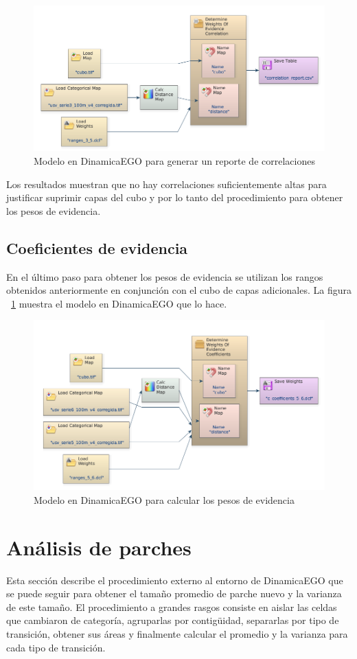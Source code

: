 \documentclass[12pt,a4paper,oldfontcommands]{article}
\begin{document}
\begin{figure}[H]
	\centering
	\includegraphics[width=1\textwidth]{./figuras/correlacion.png}
	\caption{Modelo en DinamicaEGO para generar un reporte de correlaciones}
\end{figure}
Los resultados muestran que no hay correlaciones suficientemente altas para justificar suprimir capas del cubo y por lo tanto del procedimiento para obtener los pesos de evidencia.
\subsection{Coeficientes de evidencia}
En el último paso para obtener los pesos de evidencia se utilizan los rangos obtenidos anteriormente en conjunción con el cubo de capas adicionales. La figura ~\ref{fig:evidence} muestra el modelo en DinamicaEGO que lo hace.
\begin{figure}[h]
	\centering
	\includegraphics[width=1\textwidth]{./figuras/evidence.png}
	\caption{Modelo en DinamicaEGO para calcular los pesos de evidencia}
	\label{fig:evidence}
\end{figure}
\section{Análisis de parches}
Esta sección describe el procedimiento externo al entorno de DinamicaEGO que se puede seguir para obtener el tamaño promedio de parche nuevo y la varianza de este tamaño. El procedimiento a grandes rasgos consiste en aislar las celdas que cambiaron de categoría, agruparlas por contigüidad, separarlas por tipo de transición, obtener sus áreas y finalmente calcular el promedio y la varianza para cada tipo de transición.
\end{document}
